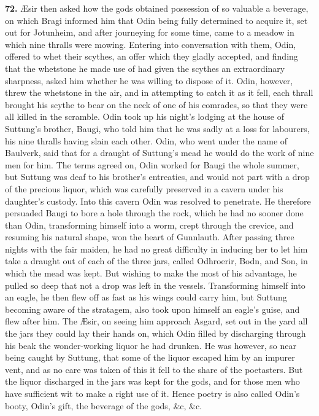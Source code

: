 \textbf{72.} Æsir then asked how the gods obtained possession of so valuable
a beverage, on which Bragi informed him that Odin being fully
determined to acquire it, set out for Jotunheim, and after journeying
for some time, came to a meadow in which nine thralls were mowing.
Entering into conversation with them, Odin, offered to whet their
scythes, an offer which they gladly accepted, and finding that the
whetstone he made use of had given the scythes an extraordinary
sharpness, asked him whether he was willing to dispose of it. Odin,
however, threw the whetstone in the air, and in attempting to catch it
as it fell, each thrall brought his scythe to bear on the neck of one
of his comrades, so that they were all killed in the scramble. Odin
took up his night's lodging at the house of Suttung's brother, Baugi,
who told him that he was sadly at a loss for labourers, his nine
thralls having slain each other. Odin, who went under the name of
Baulverk, said that for a draught of Suttung's mead he would do the
work of nine men for him. The terms agreed on, Odin worked for Baugi
the whole summer, but Suttung was deaf to his brother's entreaties,
and would not part with a drop of the precious liquor, which was
carefully preserved in a cavern under his daughter's custody. Into
this cavern Odin was resolved to penetrate. He therefore persuaded
Baugi to bore a hole through the rock, which he had no sooner done
than Odin, transforming himself into a worm, crept through the
crevice, and resuming his natural shape, won the heart of Gunnlauth.
After passing three nights with the fair maiden, he had no great
difficulty in inducing her to let him take a draught out of each of
the three jars, called Odhroerir, Bodn, and Son, in which the mead was
kept. But wishing to make the most of his advantage, he pulled so deep
that not a drop was left in the vessels. Transforming himself into an
eagle, he then flew off as fast as his wings could carry him, but
Suttung becoming aware of the stratagem, also took upon himself an
eagle's guise, and flew after him. The Æsir, on seeing him approach
Asgard, set out in the yard all the jars they could lay their hands
on, which Odin filled by discharging through his beak the
wonder-working liquor he had drunken. He was however, so near being
caught by Suttung, that some of the liquor escaped him by an impurer
vent, and as no care was taken of this it fell to the share of the
poetasters. But the liquor discharged in the jars was kept for the
gods, and for those men who have sufficient wit to make a right use of
it. Hence poetry is also called Odin's booty, Odin's gift, the
beverage of the gods, \&c, \&c.

